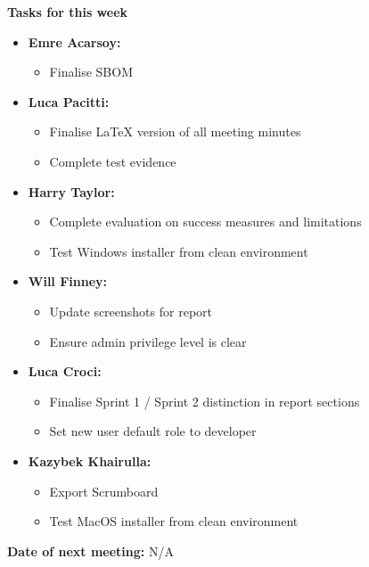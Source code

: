 \documentclass[11pt]{article}
\begin{document}
    \textbf{Tasks for this week}
    \begin{itemize}
        \item \textbf{Emre Acarsoy:}
        \begin{itemize}
            \item Finalise SBOM
        \end{itemize}

        \item \textbf{Luca Pacitti:}
        \begin{itemize}
            \item Finalise LaTeX version of all meeting minutes
            \item Complete test evidence
        \end{itemize}

        \item \textbf{Harry Taylor:}
        \begin{itemize}
            \item Complete evaluation on success measures and limitations
            \item Test Windows installer from clean environment
        \end{itemize}

        \item \textbf{Will Finney:}
        \begin{itemize}
            \item Update screenshots for report
            \item Ensure admin privilege level is clear
        \end{itemize}

        \item \textbf{Luca Croci:}
        \begin{itemize}
            \item Finalise Sprint 1 / Sprint 2 distinction in report sections
            \item Set new user default role to developer
        \end{itemize}

        \item \textbf{Kazybek Khairulla:}
        \begin{itemize}
            \item Export Scrumboard
            \item Test MacOS installer from clean environment
        \end{itemize}
    \end{itemize}

    \textbf{Date of next meeting:} N/A
\end{document}
